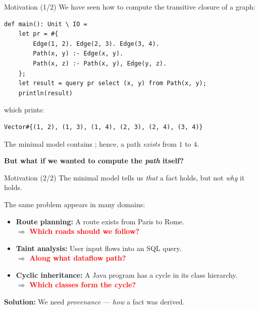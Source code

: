\begin{frame}[fragile]{Motivation (1/2)}
We have seen how to compute the transitive closure of a graph:

\begin{lstlisting}[language=flix, xleftmargin=0.8cm]
def main(): Unit \ IO =
    let pr = #{
        Edge(1, 2). Edge(2, 3). Edge(3, 4).
        Path(x, y) :- Edge(x, y).
        Path(x, z) :- Path(x, y), Edge(y, z).
    };
    let result = query pr select (x, y) from Path(x, y);
    println(result)
\end{lstlisting}

which prints:

\begin{lstlisting}[language=flix, xleftmargin=0.8cm]
Vector#{(1, 2), (1, 3), (1, 4), (2, 3), (2, 4), (3, 4)}
\end{lstlisting}

The minimal model contains ; hence, a path \emph{exists} from
$1$ to $4$.

\pause

{\large \textbf{But what if we wanted to compute the \emph{path} itself?}}
\end{frame}

\begin{frame}{Motivation (2/2)}
The minimal model tells us \emph{that} a fact holds, but not \emph{why} it holds.

The same problem appears in many domains:

\begin{itemize}
    \pause \item \textbf{Route planning:} A route exists from Paris to Rome. \\
    $\Rightarrow$ \textcolor{red}{\bfseries Which roads should we follow?}
    \pause \item \textbf{Taint analysis:} User input flows into an SQL query. \\
    $\Rightarrow$ \textcolor{red}{\bfseries Along what dataflow path?}
    \pause \item \textbf{Cyclic inheritance:} A Java program has a cycle in its
    class hierarchy. \\
    $\Rightarrow$ \textcolor{red}{\bfseries Which classes form the cycle?}
\end{itemize}

\pause

\begin{center}
\Large
\textbf{Solution:} We need \emph{provenance} --- \emph{how} a fact was derived.
\end{center}
\end{frame}

